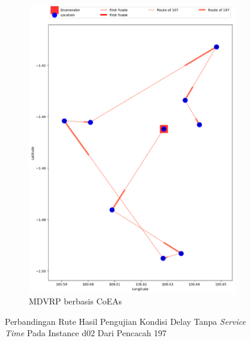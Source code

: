 \begin{figure}[H]
	\centering
	\begin{subfigure}[t]{\textwidth}
		\centering
		\includegraphics[width=\textwidth]{Resources/Images/delayed_2/real_m15_n100_delayed_2_197_coes}
		\caption{MDVRP berbasis CoEAs}
		\label{fig:real_m15_n100_delayed_2_197_coes}
	\end{subfigure}
	\caption{Perbandingan Rute Hasil Pengujian Kondisi Delay Tanpa \textit{Service Time} Pada Instance d02 Dari Pencacah 197}
	\label{fig:real_m15_n100_delayed_2_197}
\end{figure}


